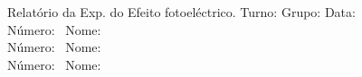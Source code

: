 \documentclass[a4paper,12pt]{article}  %
\author{Prof. Bernardo B. Carvalho}
\date{ Setembro 2015}
\newcommand{\HRule}{\rule{\linewidth}{0.5mm}}
\begin{document}
 



{  \sf \Large Relatório da Exp. do Efeito fotoeléctrico.} %
Turno:\underline{\makebox[0.7cm][l]{~}} Grupo:\underline{\makebox[0.7cm][l]{~}} Data:\underline{\makebox[1.2 cm][l]{~}}\\
\noindent Número:~\underline{\makebox[2cm][r]{~}} Nome:~\underline{\makebox[10cm][r]{~}} \\
\noindent Número:~\underline{\makebox[2cm][r]{~}} Nome:~\underline{\makebox[10cm][r]{~}} \\
\noindent Número:~\underline{\makebox[2cm][r]{~}} Nome:~\underline{\makebox[10cm][r]{~}} 


\end{document}

